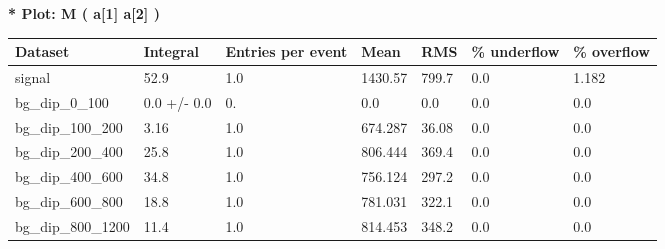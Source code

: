 \documentclass[a4paper, 10pt]{article}
\begin{document}
\textbf{* Plot: M ( a[1] a[2] ) }\\
   \begin{table}[H]
  \begin{center}
    \begin{tabular}{|m{23.0mm}|m{23.0mm}|m{18.0mm}|m{19.0mm}|m{19.0mm}|m{19.0mm}|m{19.0mm}|}
      \hline
      {\cellcolor{yellow}         Dataset}& {\cellcolor{yellow}         Integral}& {\cellcolor{yellow}         Entries per event}& {\cellcolor{yellow}         Mean}& {\cellcolor{yellow}         RMS}& {\cellcolor{yellow}         \% underflow}& {\cellcolor{yellow}         \% overflow}\\
      \hline
      {\cellcolor{white}         signal}& {\cellcolor{white}         52.9}& {\cellcolor{white}         1.0}& {\cellcolor{white}         1430.57}& {\cellcolor{white}         799.7}& {\cellcolor{green}         0.0}& {\cellcolor{green}         1.182}\\
      \hline
      {\cellcolor{white}         bg\_dip\_0\_100}& {\cellcolor{white}         0.0 +/\-- 0.0}& {\cellcolor{white}         0.}& {\cellcolor{white}         0.0}& {\cellcolor{white}         0.0}& {\cellcolor{green}         0.0}& {\cellcolor{green}         0.0}\\
      \hline
      {\cellcolor{white}         bg\_dip\_100\_200}& {\cellcolor{white}         3.16}& {\cellcolor{white}         1.0}& {\cellcolor{white}         674.287}& {\cellcolor{white}         36.08}& {\cellcolor{green}         0.0}& {\cellcolor{green}         0.0}\\
      \hline
      {\cellcolor{white}         bg\_dip\_200\_400}& {\cellcolor{white}         25.8}& {\cellcolor{white}         1.0}& {\cellcolor{white}         806.444}& {\cellcolor{white}         369.4}& {\cellcolor{green}         0.0}& {\cellcolor{green}         0.0}\\
      \hline
      {\cellcolor{white}         bg\_dip\_400\_600}& {\cellcolor{white}         34.8}& {\cellcolor{white}         1.0}& {\cellcolor{white}         756.124}& {\cellcolor{white}         297.2}& {\cellcolor{green}         0.0}& {\cellcolor{green}         0.0}\\
      \hline
      {\cellcolor{white}         bg\_dip\_600\_800}& {\cellcolor{white}         18.8}& {\cellcolor{white}         1.0}& {\cellcolor{white}         781.031}& {\cellcolor{white}         322.1}& {\cellcolor{green}         0.0}& {\cellcolor{green}         0.0}\\
      \hline
      {\cellcolor{white}         bg\_dip\_800\_1200}& {\cellcolor{white}         11.4}& {\cellcolor{white}         1.0}& {\cellcolor{white}         814.453}& {\cellcolor{white}         348.2}& {\cellcolor{green}         0.0}& {\cellcolor{green}         0.0}\\

\end{tabular}
\end{center}
\end{table}
\end{document}
